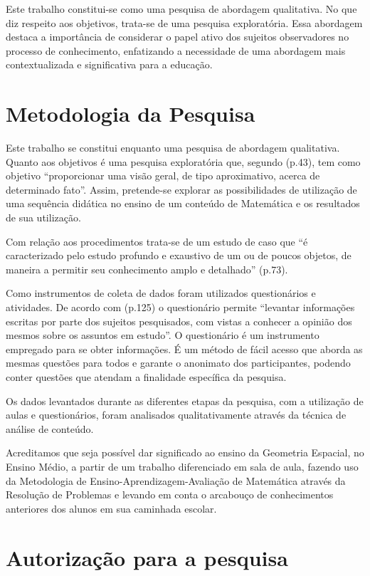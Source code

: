 Este trabalho constitui-se como uma pesquisa de abordagem qualitativa. No que diz respeito aos objetivos, trata-se de uma pesquisa exploratória. Essa abordagem destaca a importância de considerar o papel ativo dos sujeitos observadores no processo de conhecimento, enfatizando a necessidade de uma abordagem mais contextualizada e significativa para a educação.

\section{Metodologia da Pesquisa}

Este trabalho se constitui enquanto uma pesquisa de abordagem qualitativa. Quanto aos objetivos é uma pesquisa exploratória que, segundo  (p.43), tem como objetivo ``proporcionar uma visão geral, de tipo aproximativo, acerca de determinado fato''.  Assim, pretende-se explorar as possibilidades de utilização de uma sequência didática no ensino de um conteúdo de Matemática e os resultados de sua utilização.

Com relação aos procedimentos trata-se de um estudo de caso que ``é caracterizado pelo estudo profundo e exaustivo de um ou de poucos objetos, de maneira a permitir seu conhecimento amplo e detalhado'' \cite{gil_metodos_2008} (p.73).

Como instrumentos de coleta de dados foram utilizados questionários e atividades. De acordo com  (p.125) o questionário permite ``levantar informações escritas por parte dos sujeitos pesquisados, com vistas a conhecer a opinião dos mesmos sobre os assuntos em estudo''. O questionário é um instrumento empregado para se obter informações. É um método de fácil acesso que aborda as mesmas questões para todos e garante o anonimato dos participantes, podendo conter questões que atendam a finalidade específica da pesquisa.

Os dados levantados durante as diferentes etapas da pesquisa, com a utilização de aulas e questionários, foram analisados qualitativamente através da técnica de análise de conteúdo.

Acreditamos que seja possível dar significado ao ensino da Geometria Espacial, no Ensino Médio, a partir de um trabalho diferenciado em sala de aula, fazendo uso da Metodologia de Ensino-Aprendizagem-Avaliação de Matemática através da Resolução de Problemas e levando em conta o arcabouço de  conhecimentos anteriores dos alunos em sua caminhada escolar.

\section{Autorização para a pesquisa}

